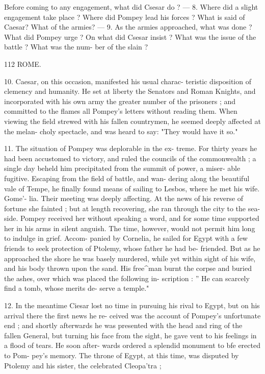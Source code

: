 \documentclass[openany,a4paper]{memoir}
\begin{document}
Before coming to any engagement, what did Csesar do ? — 8. Where did 
a slight engagement take place ? Where did Pompey lead his forces ? 
What is said of Caesar? What of the armies? — 9. As the armies 
approached, what was done ? What did Pompey urge ? On what did 
Csesar insist ? What was the issue of the battle ? What was the num- 
ber of the slain ? 



112 ROME. 

10. Caesar, on this occasion, manifested his usual charac- 
teristic disposition of clemency and humanity. He set at 
liberty the Senators and Roman Knights, and incorporated 
with his own army the greater number of the prisoners ; 
and committed to the flames all Pompey's letters without 
reading them. When viewing the field strewed with his 
fallen countrymen, he seemed deeply affected at the melan- 
choly spectacle, and was heard to say: "They would have 
it so." 

11. The situation of Pompey was deplorable in the ex- 
treme. For thirty years he had been accustomed to victory, 
and ruled the councils of the commonwealth ; a single day 
beheld him precipitated from the summit of power, a miser- 
able fugitive. Escaping from the field of battle, and wan- 
dering along the beautiful vale of Tempe, he finally found 
means of sailing to Lesbos, where he met his wife. Gome'- 
lia. Their meeting was deeply affecting. At the news of 
his reverse of fortune she fainted ; but at length recovering, 
she ran through the city to the sea-side. Pompey received 
her without speaking a word, and for some time supported 
her in his arms in silent anguish. The time, however, 
would not permit him long to indulge in grief. Accom- 
panied by Cornelia, he sailed for Egypt with a few friends 
to seek protection of Ptolemy, whose father he had be- 
friended. But as he approached the shore he was basely 
murdered, while yet within sight of his wife, and his body 
thrown upon the sand. His free^man burnt the corpse and 
buried the ashes, over which was placed the following in- 
scription : '' He can scarcely find a tomb, whose merits de- 
serve a temple." 

12. In the meantime Ciesar lost no time in pursuing his 
rival to Egypt, but on his arrival there the first news he re- 
ceived was the account of Pompey's unfortunate end ; and 
shortly afterwards he was presented with the head and ring 
of the fallen General, but turning his face from the sight, he 
gave vent to his feelings in a flood of tears. He soon after- 
wards ordered a splendid monument to bfe erected to Pom- 
pey's memory. The throne of Egypt, at this time, was 
disputed by Ptolemy and his sister, the celebrated Cleopa'tra ; 
\end{document}
